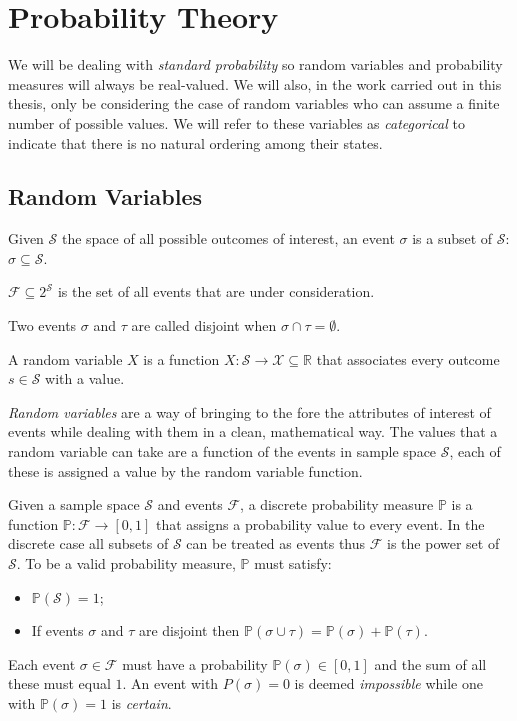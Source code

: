 \section{Probability Theory} \label{sec:probability-theory}
We will be dealing with \textit{standard probability} so random variables and probability measures will always be real-valued.
We will also, in the work carried out in this thesis, only be considering the case of random variables who can assume a finite number of possible values.
We will refer to these variables as \textit{categorical} to indicate that there is no natural ordering among their states.

\subsection{Random Variables} \label{subsec:random-variables}
\begin{definition}[Event]
	Given $\mathcal{S}$ the space of all possible outcomes of interest, an event $\sigma$ is a subset of $\mathcal{S}$: $\sigma \subseteq \mathcal{S}$.
	
	$\mathcal{F} \subseteq 2^{\mathcal{S}}$ is the set of all events that are under consideration.
	
	Two events $\sigma$ and $\tau$ are called disjoint when $\sigma \cap \tau = \emptyset$.
\end{definition}

\begin{definition}
	A random variable $X$ is a function $X: \mathcal{S} \rightarrow \mathcal{X} \subseteq \mathbb{R}$ that associates every outcome $s \in \mathcal{S}$ with a value.
\end{definition}

\textit{Random variables} are a way of bringing to the fore the attributes of interest of events while dealing with them in a clean, mathematical way.
The values that a random variable can take are a function of the events in sample space $\mathcal{S}$, each of these is assigned a value by the random variable function.

\begin{definition} \label{def:probability-measure}
	Given a sample space $\mathcal{S}$ and events $\mathcal{F}$, a discrete probability measure $\mathbb{P}$ is a function $\mathbb{P}: \mathcal{F} \rightarrow [0,1]$ that assigns a probability value to every event. 
	In the discrete case all subsets of $\mathcal{S}$ can be treated as events thus $\mathcal{F}$ is the power set of $\mathcal{S}$.
To be a valid probability measure, $\mathbb{P}$ must satisfy:
\begin{itemize}
	\item $\mathbb{P}(\mathcal{S}) = 1$;
	\item If events $\sigma$ and $\tau$ are disjoint then $\mathbb{P}(\sigma \cup \tau)=\mathbb{P}(\sigma)+\mathbb{P}(\tau)$.
\end{itemize}
\end{definition}
Each event $\sigma \in \mathcal{F}$ must have a probability $\mathbb{P}(\sigma) \in [0,1]$ and the sum of all these must equal $1$. 
An event with $P(\sigma) = 0$ is deemed \textit{impossible} while one with $\mathbb{P}(\sigma) = 1$ is \textit{certain}.

